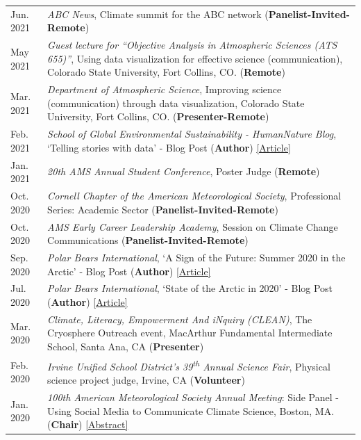 \documentclass[margin,line,palatino,courier,10pt]{res}
\begin{document}
\begin{resume}
\begin{tabular}{@{}p{0.9in}p{4in}}
Jun. 2021 & \textit{ABC News}, Climate summit for the ABC network (\textbf{Panelist-Invited-Remote})\\
May 2021 & \textit{Guest lecture for ``Objective Analysis in Atmospheric Sciences (ATS 655)''}, Using data visualization for effective science (communication), Colorado State University, Fort Collins, CO. (\textbf{Remote})\\
Mar. 2021 & \textit{Department of Atmospheric Science}, Improving science (communication) through data visualization, Colorado State University, Fort Collins, CO. (\textbf{Presenter-Remote})\\
Feb. 2021 & \textit{School of Global Environmental Sustainability - HumanNature Blog}, `Telling stories with data' - Blog Post (\textbf{Author}) \href{https://sustainability.colostate.edu/blog/humannature/zachary-labe/}{[Article]}\\
Jan. 2021 & \textit{20th AMS Annual Student Conference}, Poster Judge (\textbf{Remote})\\
Oct. 2020 & \textit{Cornell Chapter of the American Meteorological Society}, Professional Series: Academic Sector (\textbf{Panelist-Invited-Remote})\\
Oct. 2020 & \textit{AMS Early Career Leadership Academy}, Session on Climate Change Communications (\textbf{Panelist-Invited-Remote})\\
Sep. 2020 & \textit{Polar Bears International}, `A Sign of the Future: Summer 2020 in the Arctic' - Blog Post (\textbf{Author}) \href{https://polarbearsinternational.org/news/article-climate-change/a-sign-of-the-future-summer-2020-in-the-arctic/}{[Article]}\\
Jul. 2020 & \textit{Polar Bears International}, `State of the Arctic in 2020' - Blog Post (\textbf{Author}) \href{https://polarbearsinternational.org/news/article-climate-change/state-of-the-arctic-in-2020/}{[Article]}\\
Mar. 2020 &\textit{Climate, Literacy, Empowerment And iNquiry (CLEAN)}, The Cryosphere Outreach event, MacArthur Fundamental Intermediate School, Santa Ana, CA (\textbf{Presenter})\\
Feb. 2020 & \textit{Irvine Unified School District's 39\textsuperscript{th} Annual Science Fair}, Physical science project judge, Irvine, CA (\textbf{Volunteer})\\
Jan. 2020 & \textit{100th American Meteorological Society Annual Meeting}: Side Panel - Using Social Media to Communicate Climate Science, Boston, MA. (\textbf{Chair}) \href{https://ams.confex.com/ams/2020Annual/meetingapp.cgi/Session/53195}{[Abstract]}\\

\end{tabular}
\end{resume}
\end{document}
